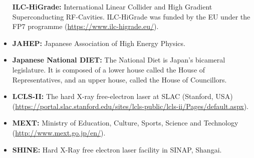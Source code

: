 \documentclass[%
 reprint,
 floatfix,
 amsmath,amssymb,
 aps,
]{revtex4-1}
\begin{document}
\begin{itemize}
\textbf{ILC-HiGrade:} International Linear Collider and High Gradient Superconducting RF-Cavities. ILC-HiGrade was funded by the EU under the FP7 programme (\url{https://www.ilc-higrade.eu/}).
\item
\textbf{JAHEP:} Japanese Association of High Energy Physics.
\item
\textbf{Japanese National DIET:} The National Diet is Japan's bicameral legislature. It is composed of a lower house called the House of Representatives, and an upper house, called the House of Councillors.
\item
\textbf{LCLS-II:}  The hard X-ray free-electron laser at SLAC (Stanford, USA)(\url{https://portal.slac.stanford.edu/sites/lcls-public/lcls-ii/Pages/default.aspx}).
\item
\textbf{MEXT:} Ministry of Education, Culture, Sports, Science and Technology (\url{http://www.mext.go.jp/en/}).
\item
\textbf{SHINE:} Hard X-Ray free electron laser facility in SINAP, Shangai.
\end{itemize}
\end{document}
